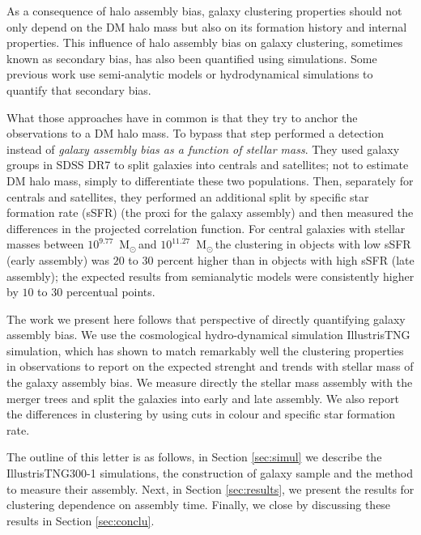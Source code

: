 \documentclass[fleqn,usenatbib]{mnras}
\newcommand{\Msun}{\,{\rm M}$_{\odot}$\,}
\begin{document}
As a consequence of halo assembly bias, galaxy clustering properties should not only depend on
the DM halo mass but also on its formation history and internal
properties.
This influence of halo assembly bias on galaxy clustering, sometimes known as
secondary bias, has also been quantified using simulations. 
Some previous work use semi-analytic models 
\citep{2007MNRAS.374.1303C,2014ApJ...794...74J,2019MNRAS.484.1133C}
or hydrodynamical simulations
\citep{2018MNRAS.480.3978A,2020MNRAS.492.2739X,2020MNRAS.tmp.1844M}
to quantify that secondary bias. 

What those approaches have in common is that they try to anchor the
observations to a DM halo mass. 
To bypass that step \citet{2013MNRAS.433..515W} performed a detection
instead of \emph{galaxy assembly bias as a function of stellar mass}.
They used galaxy groups in SDSS DR7 to split galaxies into centrals
and satellites; not to estimate DM halo mass, simply to differentiate
these two populations.
Then, separately for centrals and satellites, they performed an additional
split by specific star formation rate (sSFR) (the proxi for the galaxy
assembly) and then measured the differences in the projected correlation function.
For central galaxies with stellar masses between $10^{9.77}$ \Msun and
$10^{11.27}$ \Msun the clustering in objects with low sSFR (early
assembly) was $20$ to $30$ percent higher than in objects with high
sSFR (late assembly); the expected results from semianalytic models
were consistently higher by $10$ to $30$ percentual points. 

The work we present here follows that perspective of directly
quantifying galaxy assembly bias.
We use the cosmological hydro-dynamical simulation IllustrisTNG simulation,
which has shown to match remarkably well the clustering properties in
observations \citep{2018MNRAS.475..676S} to report on the expected
strenght and trends with stellar mass of the galaxy assembly bias.
We measure directly the stellar mass assembly with the merger trees
and split the galaxies into early and late assembly.
We also report the differences in clustering by using cuts in colour
and specific star formation rate.

The outline of this letter is as follows, in Section \ref{sec:simul}
we describe the IllustrisTNG300-1 simulations, the construction of
galaxy sample and the method to measure their assembly.
Next, in Section \ref{sec:results}, we present the results for
clustering dependence on assembly time.
Finally, we close by discussing these results in Section \ref{sec:conclu}. 
\end{document}
